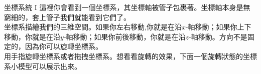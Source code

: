 \begin{surferPage}{坐標系統 I}
這裡你會看到一個坐標系，其坐標軸被管子包裹著。坐標軸本身是無窮細的，套上管子我們就能看到它們了。\\
坐標系描繪我們的三維空間。如果你左右移動,你就是在沿$x$-軸移動；如果你上下移動，你就是在沿$y$-軸移動；如果你前後移動，你就是在沿$z$-軸移動。方向不是固定的，因為你可以旋轉坐標系。\\
\vspace{0.3cm}
用手指旋轉坐標系或者拖拽坐標系。想看看旋轉的效果，下面一個旋轉狀態的坐標系小模型可以展示出來。
\end{surferPage}
